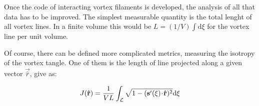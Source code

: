 Once the code of interacting vortex filaments is developed, the analysis of all that data has to be improved. The simplest measurable quantity is the total lenght of all vortex lines. In a finite volume this would be $L = (1/V) \int \text{d}\xi$ for the vortex line per unit volume.

Of course, there can be defined more complicated metrics, measuring the isotropy of the vortex tangle. One of them is the length of line projected along a given vector $\vec{\hat{r}}$, give as:

\begin{equation}
J(\mathbf{\hat{r}}) = \frac{1}{VL} \int_{\mathcal{L}} \sqrt{1 - (\mathbf{s}^{\prime}(\xi) \!\cdot\! \mathbf{\hat{r}})^2} \text{d}\xi
\end{equation}




\newpage
